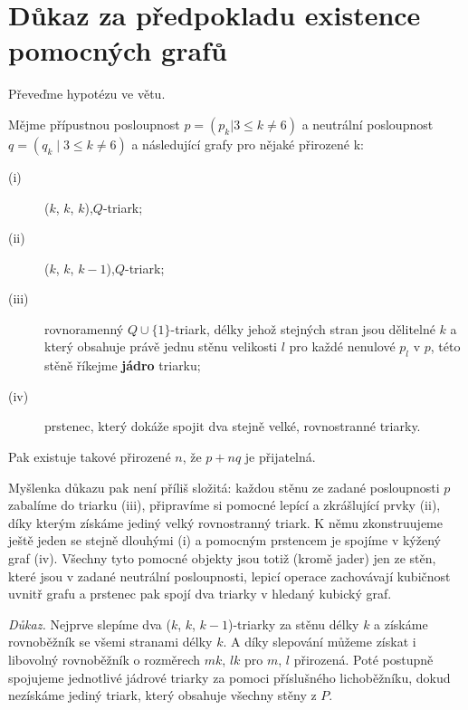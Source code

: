 

\section{Důkaz za předpokladu existence pomocných grafů}
Převeďme hypotézu ve větu.

\begin{veta}\label{veta02:2}
Mějme přípustnou posloupnost $p=(p_k | 3 \leq k \neq 6)$ a neutrální posloupnost $q=(q_k \mid 3 \leq k \neq 6)$ a následující grafy pro nějaké přirozené k:
\begin{description}
\item[(i)] ($k$, $k$, $k$),$Q$-triark;
\item[(ii)] ($k$, $k$, $k-1$),$Q$-triark;
\item[(iii)] rovnoramenný $Q\cup \lbrace1\rbrace$-triark, délky jehož stejných stran jsou dělitelné $k$ a který obsahuje právě jednu stěnu velikosti $l$ pro každé nenulové $p_l$ v $p$, této stěně říkejme \textbf{jádro} triarku;
\item[(iv)] prstenec, který dokáže spojit dva stejně velké, rovnostranné triarky.
\end{description}

Pak existuje takové přirozené $n$, že $p+nq$ je přijatelná.
\end{veta}


Myšlenka důkazu pak není příliš složitá: každou stěnu ze zadané posloupnosti $p$ zabalíme do triarku (iii), připravíme si pomocné lepící a zkrášlující prvky (ii), díky kterým získáme jediný velký rovnostranný triark. K němu zkonstruujeme ještě jeden se stejně dlouhými (i) a pomocným prstencem je spojíme v kýžený graf (iv). Všechny tyto pomocné objekty jsou totiž (kromě jader) jen ze stěn, které jsou v zadané neutrální posloupnosti, lepicí operace zachovávají kubičnost uvnitř grafu a prstenec pak spojí dva triarky v hledaný kubický graf.

\textit{Důkaz.} Nejprve slepíme dva ($k$, $k$, $k-1$)-triarky za stěnu délky $k$ a získáme rovnoběžník se všemi stranami délky $k$. A díky slepování můžeme získat i libovolný rovnoběžník o rozměrech $mk$, $lk$ pro $m$, $l$ přirozená. Poté postupně spojujeme jednotlivé jádrové triarky za pomoci příslušného lichoběžníku, dokud nezískáme jediný triark, který obsahuje všechny stěny z $P$.

